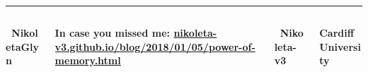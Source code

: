 \documentclass[usenames,dvipsnames,t]{beamer}
\begin{document}
\hrule height 3pt
\begin{columns}
    \begin{column}{.1\linewidth}

        \centering
        \textbf{ \faTwitter \ NikoletaGlyn}
    \end{column}
    \begin{column}{.55\linewidth}

        \centering
        \textbf{ In case you missed me: \url{nikoleta-v3.github.io/blog/2018/01/05/power-of-memory.html}}
    \end{column}
    \begin{column}{.1\linewidth}

        \centering
        \textbf{ \faGithub \ Nikoleta-v3}
    \end{column}
    \begin{column}{.1\linewidth}

        \centering
        \textbf{Cardiff University}
    \end{column}
\end{columns}
\end{document}
